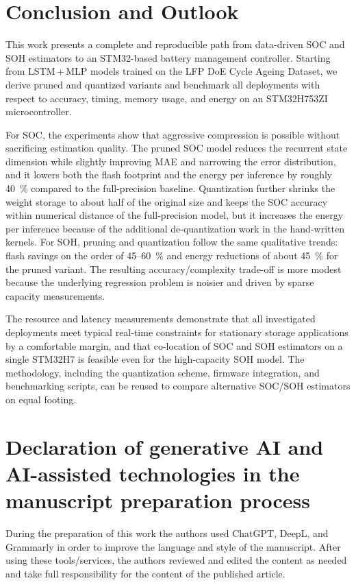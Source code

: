 \documentclass[review]{elsarticle}
\begin{document}
\section{Conclusion and Outlook}
This work presents a complete and reproducible path from data-driven SOC and SOH estimators to an STM32-based battery management controller. Starting from LSTM\,+\,MLP models trained on the LFP DoE Cycle Ageing Dataset, we derive pruned and quantized variants and benchmark all deployments with respect to accuracy, timing, memory usage, and energy on an STM32H753ZI microcontroller.

For SOC, the experiments show that aggressive compression is possible without sacrificing estimation quality. The pruned SOC model reduces the recurrent state dimension while slightly improving MAE and narrowing the error distribution, and it lowers both the flash footprint and the energy per inference by roughly 40~\% compared to the full-precision baseline. Quantization further shrinks the weight storage to about half of the original size and keeps the SOC accuracy within numerical distance of the full-precision model, but it increases the energy per inference because of the additional de-quantization work in the hand-written kernels. For SOH, pruning and quantization follow the same qualitative trends: flash savings on the order of 45--60~\% and energy reductions of about 45~\% for the pruned variant. The resulting accuracy/complexity trade-off is more modest because the underlying regression problem is noisier and driven by sparse capacity measurements.

The resource and latency measurements demonstrate that all investigated deployments meet typical real-time constraints for stationary storage applications by a comfortable margin, and that co-location of SOC and SOH estimators on a single STM32H7 is feasible even for the high-capacity SOH model. The methodology, including the quantization scheme, firmware integration, and benchmarking scripts, can be reused to compare alternative SOC/SOH estimators on equal footing.


\section*{Declaration of generative AI and AI-assisted technologies in the manuscript preparation process}
During the preparation of this work the authors used ChatGPT, DeepL, and Grammarly in order to improve the language and style of the manuscript. After using these tools/services, the authors reviewed and edited the content as needed and take full responsibility for the content of the published article.
\end{document}
